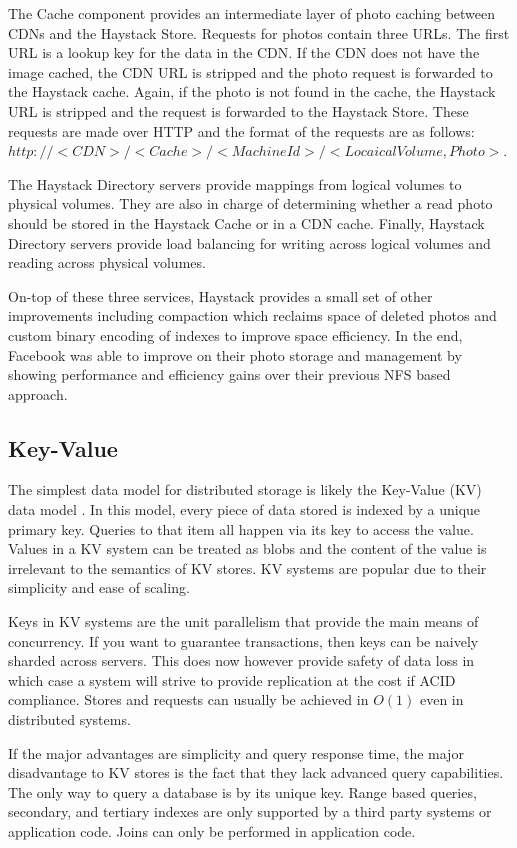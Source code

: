 \documentclass[]{article}
\begin{document}
The Cache component provides an intermediate layer of photo caching between CDNs and the Haystack Store. Requests for photos contain three URLs. The first URL is a lookup key for the data in the CDN. If the CDN does not have the image cached, the CDN URL is stripped and the photo request is forwarded to the Haystack cache. Again, if the photo is not found in the cache, the Haystack URL is stripped and the request is forwarded to the Haystack Store. These requests are made over HTTP and the format of the requests are as follows: $http://<CDN>/<Cache>/<Machine Id>/<Locaical Volume, Photo>$.

The Haystack Directory servers provide mappings from logical volumes to physical volumes. They are also in charge of determining whether a read photo should be stored in the Haystack Cache or in a CDN cache. Finally, Haystack Directory servers provide load balancing for writing across logical volumes and reading across physical volumes.

On-top of these three services, Haystack provides a small set of other improvements including compaction which reclaims space of deleted photos and custom binary encoding of indexes to improve space efficiency. In the end, Facebook was able to improve on their photo storage and management by showing performance and efficiency gains over their previous NFS based approach.

\subsection{Key-Value}
The simplest data model for distributed storage is likely the Key-Value (KV) data model \cite{weber_nosql_2010}. In this model, every piece of data stored is indexed by a unique primary key. Queries to that item all happen via its key to access the value. Values in a KV system can be treated as blobs and the content of the value is irrelevant to the semantics of KV stores. KV systems are popular due to their simplicity and ease of scaling.

Keys in KV systems are the unit parallelism that provide the main means of concurrency. If you want to guarantee transactions, then keys can be naively sharded across servers. This does now however provide safety of data loss in which case a system will strive to provide replication at the cost if ACID compliance. Stores and requests can usually be achieved in $O(1)$ even in distributed systems\cite{ravendb}.

If the major advantages are simplicity and query response time\cite{chen_big_2014}, the major disadvantage to KV stores is the fact that they lack advanced query capabilities. The only way to query a database is by its unique key. Range based queries, secondary, and tertiary indexes are only supported by a third party systems or application code. Joins can only be performed in application code\cite{design-voldemort}.
\end{document}
